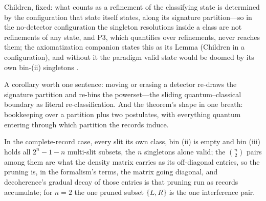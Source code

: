 \documentclass[11pt]{article}
\theoremstyle{definition}
\begin{document}
\noindent Children, fixed: what counts as a refinement of the classifying state is determined by the configuration that state itself states, along its signature partition---so in the no-detector configuration the singleton resolutions inside a class are not refinements of any state, and P3, which quantifies over refinements, never reaches them; the axiomatization companion states this as its Lemma (Children in a configuration), and without it the paradigm valid state would be doomed by its own bin-(ii) singletons \cite{AethusQuant}.

\noindent A corollary worth one sentence: moving or erasing a detector re-draws the signature partition and re-bins the powerset---the sliding quantum--classical boundary as literal re-classification. And the theorem's shape in one breath: bookkeeping over a partition plus two postulates, with everything quantum entering through which partition the records induce.

\noindent In the complete-record case, every slit its own class, bin (ii) is empty and bin (iii) holds all $2^{n}-1-n$ multi-slit subsets, the $n$ singletons alone valid; the $\binom{n}{2}$ pairs among them are what the density matrix carries as its off-diagonal entries, so the pruning is, in the formalism's terms, the matrix going diagonal, and decoherence's gradual decay of those entries \cite{zurek2003einselection} is that pruning run as records accumulate; for $n=2$ the one pruned subset $\{L,R\}$ is the one interference pair.
\end{document}
